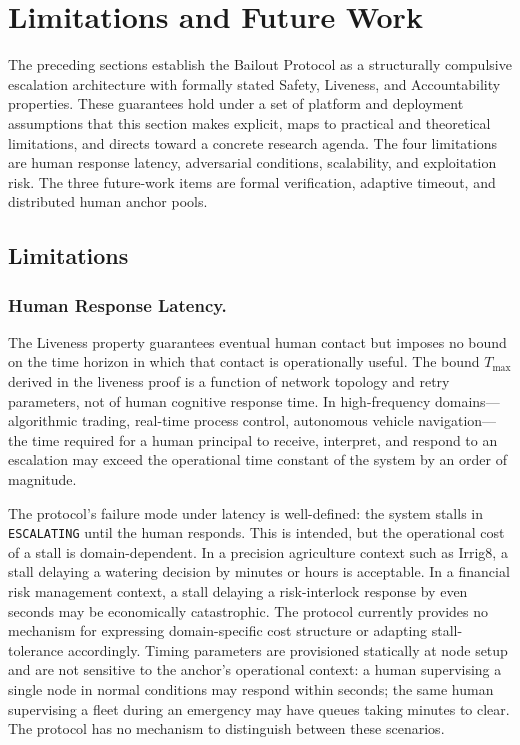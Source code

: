 \section{Limitations and Future Work}\label{sec:limitations}

The preceding sections establish the Bailout Protocol as a structurally compulsive escalation architecture with formally stated Safety, Liveness, and Accountability properties. These guarantees hold under a set of platform and deployment assumptions that this section makes explicit, maps to practical and theoretical limitations, and directs toward a concrete research agenda. The four limitations are human response latency, adversarial conditions, scalability, and exploitation risk. The three future-work items are formal verification, adaptive timeout, and distributed human anchor pools.

\subsection{Limitations}

\subsubsection{Human Response Latency.}
The Liveness property guarantees eventual human contact but imposes no bound on the time horizon in which that contact is operationally useful. The bound $T_{\max}$ derived in the liveness proof is a function of network topology and retry parameters, not of human cognitive response time. In high-frequency domains---algorithmic trading, real-time process control, autonomous vehicle navigation---the time required for a human principal to receive, interpret, and respond to an escalation may exceed the operational time constant of the system by an order of magnitude.

The protocol's failure mode under latency is well-defined: the system stalls in \texttt{ESCALATING} until the human responds. This is intended, but the operational cost of a stall is domain-dependent. In a precision agriculture context such as Irrig8, a stall delaying a watering decision by minutes or hours is acceptable. In a financial risk management context, a stall delaying a risk-interlock response by even seconds may be economically catastrophic. The protocol currently provides no mechanism for expressing domain-specific cost structure or adapting stall-tolerance accordingly. Timing parameters are provisioned statically at node setup and are not sensitive to the anchor's operational context: a human supervising a single node in normal conditions may respond within seconds; the same human supervising a fleet during an emergency may have queues taking minutes to clear. The protocol has no mechanism to distinguish between these scenarios.

